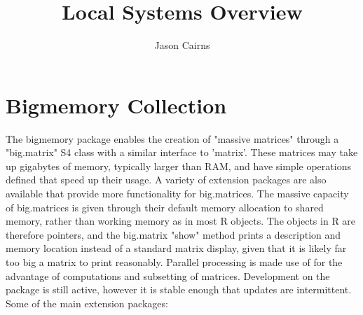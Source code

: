 \documentclass[10pt,a4paper]{article}
\begin{document}
\title{Local Systems Overview}
\author{Jason Cairns}
\maketitle{}

\section{Bigmemory Collection}
\label{sec:bigmemory-collection}

The bigmemory package enables the creation of "massive matrices"
through a "big.matrix" S4 class with a similar interface to
'matrix'\cite{kane13:bigmemory}. These matrices may take up gigabytes
of memory, typically larger than RAM, and have simple operations
defined that speed up their usage. A variety of extension packages are
also available that provide more functionality for big.matrices. The
massive capacity of big.matrices is given through their default memory
allocation to shared memory, rather than working memory as in most R
objects. The objects in R are therefore pointers, and the big.matrix
"show" method prints a description and memory location instead of a
standard matrix display, given that it is likely far too big a matrix
to print reasonably. Parallel processing is made use of for the
advantage of computations and subsetting of matrices. Development on
the package is still active, however it is stable enough that updates
are intermittent. Some of the main extension packages:
\end{document}
